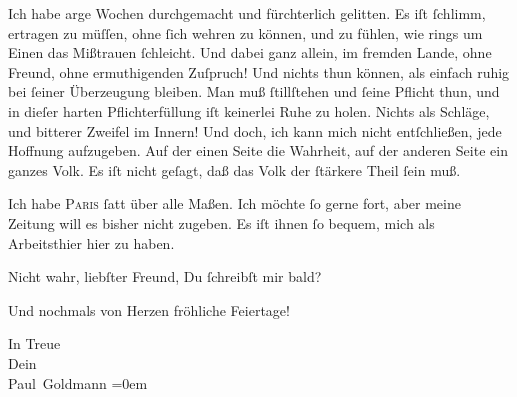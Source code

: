 \pstart
           Ich habe arge Wochen durchgemacht und fürchterlich gelitten. Es iſt{ }ſchlimm, \label{K_L02834-7v}\label{K_L02834-7} ertragen zu müſſen, {\pb}ohne{ }ſich wehren zu
               können, und zu fühlen, wie rings um Einen das Mißtrauen{ }ſchleicht. Und dabei ganz
               allein, im fremden Lande, ohne Freund, ohne
               ermuthigenden Zuſpruch! Und nichts thun können, als einfach ruhig bei{ }ſeiner
               Überzeugung bleiben. Man muß ſtillſtehen und{ }ſeine Pflicht thun, und in dieſer harten Pflichterfüllung iſt keinerlei Ruhe\strikeout{\textcolor{gray}{n}} zu holen. Nichts als Schläge, und bitterer Zweifel im Innern! Und doch, ich
               kann mich nicht entſchließen, jede Hoffnung aufzugeben. Auf der einen Seite die
               Wahrheit, auf der anderen Seite ein ganzes Volk. Es iſt nicht geſagt, {\pb}daß das Volk der{ }ſtärkere Theil{ }ſein
               muß.\pend
           
\pstart
           Ich habe \textsc{Paris}{ }ſatt über alle Maßen. Ich möchte{ }ſo gerne fort, aber meine Zeitung will \strikeout{\textcolor{gray}{m}} es bisher nicht zugeben. Es iſt ihnen{ }ſo bequem, mich als  Arbeitsthier hier zu haben.\pend
           
\pstart
           Nicht wahr, liebſter Freund, Du{ }ſchreibſt mir bald?\pend
           
\pstart
           Und nochmals von Herzen fröhliche Feiertage!\pend
           
\pstart
           In Treue {\\[\baselineskip]}Dein {\\[\baselineskip]}\spacefill\mbox{Paul Goldmann}\pend
           \leftskip=0em{}\endnumbering{}  \newcommand{\dateiname}{L02834}\newcommand{\titel}{Paul Goldmann an Arthur Schnitzler, 23. 12. [1897]}\newcommand{\editorInnen}{Martin Anton Müller und Laura Untner}
